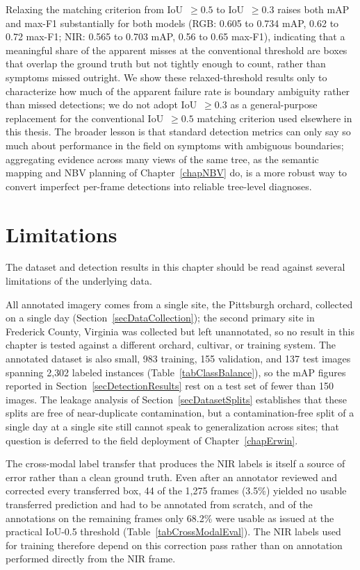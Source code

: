 Relaxing the matching criterion from IoU~$\geq 0.5$ to IoU~$\geq 0.3$
raises both mAP and max-F1 substantially for both models (RGB: 0.605 to
0.734 mAP, 0.62 to 0.72 max-F1; NIR: 0.565 to 0.703 mAP, 0.56 to 0.65
max-F1), indicating that a meaningful share of the apparent misses at
the conventional threshold are boxes that overlap the ground truth but
not tightly enough to count, rather than symptoms missed outright.
We show these relaxed-threshold results only to characterize how much
of the apparent failure rate is boundary ambiguity rather than missed
detections; we do not adopt IoU~$\geq 0.3$ as a general-purpose
replacement for the conventional IoU~$\geq 0.5$ matching criterion used
elsewhere in this thesis.
The broader lesson is that standard detection metrics can only say
so much about performance in the field on symptoms with ambiguous
boundaries; aggregating evidence across many views of the same tree,
as the semantic mapping and NBV planning of Chapter~\ref{chapNBV} do,
is a more robust way to convert imperfect per-frame detections into
reliable tree-level diagnoses.

\section{Limitations} \label{secDatasetLimitations}

The dataset and detection results in this chapter should be read against
several limitations of the underlying data.

All annotated imagery comes from a single site, the Pittsburgh orchard,
collected on a single day (Section~\ref{secDataCollection}); the second
primary site in Frederick County, Virginia was collected but left
unannotated, so no result in this chapter is tested against a different
orchard, cultivar, or training system.
The annotated dataset is also small, 983 training, 155 validation, and 137
test images spanning 2{,}302 labeled instances
(Table~\ref{tabClassBalance}), so the mAP figures reported in
Section~\ref{secDetectionResults} rest on a test set of fewer than 150
images.
The leakage analysis of Section~\ref{secDatasetSplits} establishes that
these splits are free of near-duplicate contamination, but a
contamination-free split of a single day at a single site still cannot
speak to generalization across sites; that question is deferred to the
field deployment of Chapter~\ref{chapErwin}.

The cross-modal label transfer that produces the NIR labels is itself a
source of error rather than a clean ground truth.
Even after an annotator reviewed and corrected every transferred box, 44
of the 1{,}275 frames (3.5\%) yielded no usable transferred prediction and
had to be annotated from scratch, and of the annotations on the remaining
frames only 68.2\% were usable as issued at the practical IoU-0.5
threshold (Table~\ref{tabCrossModalEval}).
The NIR labels used for training therefore depend on this correction pass
rather than on annotation performed directly from the NIR frame.

